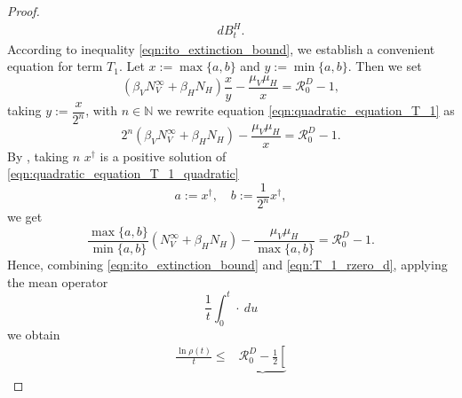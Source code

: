 \begin{proof}
\begin{equation}
\begin{aligned}
            d B_t ^ H.
        \end{aligned}
    \end{equation}
    According to inequality \eqref{eqn:ito_extinction_bound}, we establish
    a convenient equation for term $T_1$. 
    Let $x:= \max \{ a, b\}$ and $y := \min \{a,b\}$. Then we set
    \begin{equation}
        \label{eqn:quadratic_equation_T_1}
        \left (
            \beta_V
             N_V ^ \infty
            +
            \beta_H N_H
        \right )\frac{x}{y}
        -
        \frac{\mu_V \mu_H}{x} 
        = \mathcal{R}_0^D - 1,
    \end{equation}
    taking $y := \dfrac{x}{2^n}$, with $n \in \mathbb{N}$ 
     we rewrite equation
    \eqref{eqn:quadratic_equation_T_1} as
    \begin{equation}
        \label{eqn:quadratic_equation_T_1_quadratic}
        2 ^ n
        \left (
            \beta_V
             N_V ^ \infty
            +
            \beta_H N_H
        \right )
        -
        \frac{\mu_V \mu_H}{x}
        = \mathcal{R}_0^D - 1 . 
    \end{equation}
    By , 
    taking $n$ 
    $x^\dagger$ is a positive solution
    of \eqref{eqn:quadratic_equation_T_1_quadratic}
    $$
        a:= x^\dagger, \quad b:= \frac{1}{2^n} x^{\dagger},
    $$
     we get 
    \begin{equation}\label{eqn:T_1_rzero_d}
         \dfrac{
             \max\{a, b\}
         }{
             \min\{a, b\}
         }
         \left (
              N_V ^ \infty
             +
             \beta_H N_H
         \right )
         -
         \frac{
             \mu_V \mu_H 
         }{
             \max \{a, b\} 
         }
         = \mathcal{R}_0 ^ D - 1 .
    \end{equation}
    Hence, combining \eqref{eqn:ito_extinction_bound} and 
    \eqref{eqn:T_1_rzero_d},
    applying the mean operator
    $$
        \frac{1}{t} 
            \int_{0}^{t}
                \cdot \ 
            du
    $$
     we obtain
%
    \begin{equation} 
    \label{eqn:rzero_d_bound}
        \begin{aligned}
            \frac{
                \ln \rho(t)
            }{t}
            \leq &
                \underbrace{
                    \mathcal{R}_0 ^ D
                    -
                    \frac{1}{2}
                    \left [
}
\end{aligned}
\end{equation}
\end{proof}
